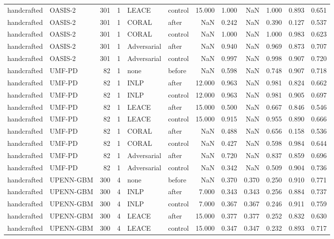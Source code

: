 \begin{tabular}{llrrllrrrrrr}
handcrafted & OASIS-2 & 301 & 1 & LEACE & control & 15.000 & 1.000 & NaN & 1.000 & 0.893 & 0.651 \\
handcrafted & OASIS-2 & 301 & 1 & CORAL & after & NaN & 0.242 & NaN & 0.390 & 0.127 & 0.537 \\
handcrafted & OASIS-2 & 301 & 1 & CORAL & control & NaN & 1.000 & NaN & 1.000 & 0.983 & 0.623 \\
handcrafted & OASIS-2 & 301 & 1 & Adversarial & after & NaN & 0.940 & NaN & 0.969 & 0.873 & 0.707 \\
handcrafted & OASIS-2 & 301 & 1 & Adversarial & control & NaN & 0.997 & NaN & 0.998 & 0.907 & 0.720 \\
handcrafted & UMF-PD & 82 & 1 & none & before & NaN & 0.598 & NaN & 0.748 & 0.907 & 0.718 \\
handcrafted & UMF-PD & 82 & 1 & INLP & after & 12.000 & 0.963 & NaN & 0.981 & 0.824 & 0.662 \\
handcrafted & UMF-PD & 82 & 1 & INLP & control & 12.000 & 0.963 & NaN & 0.981 & 0.905 & 0.697 \\
handcrafted & UMF-PD & 82 & 1 & LEACE & after & 15.000 & 0.500 & NaN & 0.667 & 0.846 & 0.546 \\
handcrafted & UMF-PD & 82 & 1 & LEACE & control & 15.000 & 0.915 & NaN & 0.955 & 0.890 & 0.666 \\
handcrafted & UMF-PD & 82 & 1 & CORAL & after & NaN & 0.488 & NaN & 0.656 & 0.158 & 0.536 \\
handcrafted & UMF-PD & 82 & 1 & CORAL & control & NaN & 0.427 & NaN & 0.598 & 0.984 & 0.644 \\
handcrafted & UMF-PD & 82 & 1 & Adversarial & after & NaN & 0.720 & NaN & 0.837 & 0.859 & 0.696 \\
handcrafted & UMF-PD & 82 & 1 & Adversarial & control & NaN & 0.342 & NaN & 0.509 & 0.904 & 0.736 \\
handcrafted & UPENN-GBM & 300 & 4 & none & before & NaN & 0.370 & 0.370 & 0.250 & 0.910 & 0.771 \\
handcrafted & UPENN-GBM & 300 & 4 & INLP & after & 7.000 & 0.343 & 0.343 & 0.256 & 0.884 & 0.737 \\
handcrafted & UPENN-GBM & 300 & 4 & INLP & control & 7.000 & 0.367 & 0.367 & 0.246 & 0.911 & 0.759 \\
handcrafted & UPENN-GBM & 300 & 4 & LEACE & after & 15.000 & 0.377 & 0.377 & 0.252 & 0.832 & 0.630 \\
handcrafted & UPENN-GBM & 300 & 4 & LEACE & control & 15.000 & 0.347 & 0.347 & 0.232 & 0.893 & 0.717 \\

\end{tabular}
